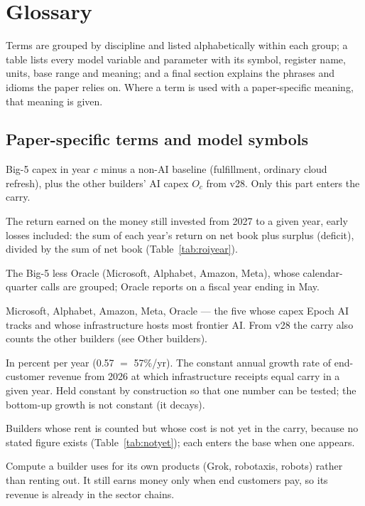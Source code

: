 \documentclass[11pt,letterpaper]{article}
\begin{document}
\section{Glossary}\label{app:glossary}
Terms are grouped by discipline and listed alphabetically within each group; a table lists every model variable and parameter with its symbol, register name, units, base range and meaning; and a final section explains the phrases and idioms the paper relies on. Where a term is used with a paper-specific meaning, that meaning is given.

\subsection*{Paper-specific terms and model symbols}
\begin{description}\setlength{\itemsep}{1pt}
\item[AI-attributable capex ($A_c$)] Big-5 capex in year $c$ minus a non-AI baseline (fulfillment, ordinary cloud refresh), plus the other builders' AI capex $O_c$ from v28. Only this part enters the carry.
\item[Average return to date] The return earned on the money still invested from 2027 to a given year, early losses included: the sum of each year's return on net book plus surplus (deficit), divided by the sum of net book (Table~\ref{tab:roiyear}).
\item[Big-4] The Big-5 less Oracle (Microsoft, Alphabet, Amazon, Meta), whose calendar-quarter calls are grouped; Oracle reports on a fiscal year ending in May.
\item[Big-5] Microsoft, Alphabet, Amazon, Meta, Oracle --- the five whose capex Epoch AI tracks and whose infrastructure hosts most frontier AI. From v28 the carry also counts the other builders (see Other builders).
\item[Break-even growth ($g^{*}$)] In percent per year (0.57 $=$ 57\%/yr). The constant annual growth rate of end-customer revenue from 2026 at which infrastructure receipts equal carry in a given year. Held constant by construction so that one number can be tested; the bottom-up growth is not constant (it decays).
\item[Builders not yet counted] Builders whose rent is counted but whose cost is not yet in the carry, because no stated figure exists (Table~\ref{tab:notyet}); each enters the base when one appears.
\item[Captive use] Compute a builder uses for its own products (Grok, robotaxis, robots) rather than renting out. It still earns money only when end customers pay, so its revenue is already in the sector chains.

\end{description}
\end{document}
